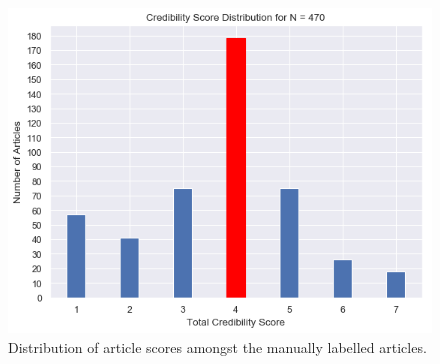 \documentclass[a4paper,twoside,phd]{BYUPhys}
\begin{document}
\begin{figure}[!htb]
	\centering
	\includegraphics[totalheight=6.5cm]{images/article-score-distribution.png}
	\caption{Distribution of article scores amongst the manually labelled articles.}
	\label{fig:ArticleDistribution}
\end{figure}
\end{document}
